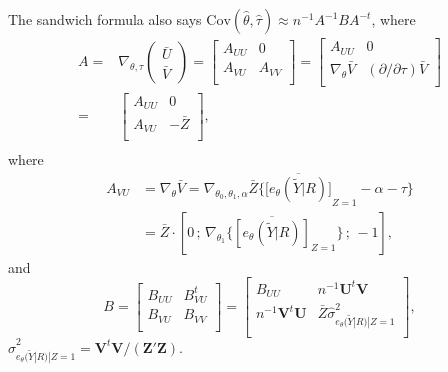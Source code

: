 \documentclass[12pt]{article}
\begin{document}
The sandwich formula also says $\mathrm{Cov}(\hat\theta, \hat\tau) \approx  n^{-1} A^{-1} B A^{-t}$, where
\begin{eqnarray*}
  A =& \nabla_{\theta, \tau} \left(
       \begin{array}{c}
         \bar{U}\\ \bar{V}
       \end{array}
\right) =\left[
      \begin{array}{c|c}
        A_{UU} & 0 \\ \hline
A_{VU} & A_{VV} \\
      \end{array}
\right] 
= \left[
  \begin{array}{c|c}
    A_{UU}  & 0 \\ \hline
       \nabla_{\theta} \bar{V}
                                      & (\partial/\partial \tau)
                                        \bar{V} \\
  \end{array}
\right] \\
=& \left[
  \begin{array}{c|c}
    A_{UU}  & 0 \\ \hline
       A_{VU} & - \bar{Z}\\
  \end{array}
\right] , \\
\end{eqnarray*}
where 
\begin{align*}
  A_{VU} &= \nabla_{\theta} \bar{V} = \nabla_{\theta_{0}, \theta_{1},
           \alpha} \bar{Z} \{ \overline{\big[e_{\theta}(\tilde{Y} | R)
           \big]}_{Z=1} -\alpha -\tau \}  \\
&= \bar{Z}  \cdot  [0 \, ; \, \nabla_{\theta_{1}} \{      \overline{[e_{\theta}(\tilde{Y} | R)]}_{Z=1} \} \, ;\,  -1  ], 
\end{align*}
and 
\begin{equation*}
 B =   \left[ \begin{array}{c|c}
        B_{UU} & B_{VU}^{t} \\ \hline
B_{VU} & B_{VV} \\
      \end{array}
\right]  
 =  \left[ \begin{array}{cc}
            B_{UU} & n^{-1}\mathbf{U}^{t}\mathbf{V} \\ 
              n^{-1}\mathbf{V}^{t}\mathbf{U} &
                                                       \bar{Z} \hat{\sigma}^{2}_{ e_{\theta}(\tilde{Y}|R) | Z=1} \\
      \end{array}
\right]  , 
\end{equation*}
$\hat{\sigma}^{2}_{ e_{\theta}(\tilde{Y}|R) | Z=1}  =   \mathbf{V}^{t}\mathbf{V}/(\mathbf{Z}'\mathbf{Z})$.
\end{document}
